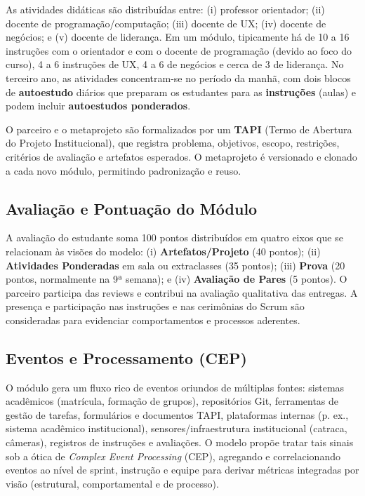 \documentclass[12pt,a4paper]{article}
\begin{document}
As atividades didáticas são distribuídas entre: (i) professor orientador;
(ii) docente de programação/computação; (iii) docente de UX; (iv) docente de
negócios; e (v) docente de liderança. Em um módulo, tipicamente há de 10 a 16
instruções com o orientador e com o docente de programação (devido ao foco do
curso), 4 a 6 instruções de UX, 4 a 6 de negócios e cerca de 3 de liderança. No
terceiro ano, as atividades concentram-se no período da manhã, com dois blocos
de \textbf{autoestudo} diários que preparam os estudantes para as \textbf{instruções}
(aulas) e podem incluir \textbf{autoestudos ponderados}.

O parceiro e o metaprojeto são formalizados por um \textbf{TAPI} (Termo de Abertura
do Projeto Institucional), que registra problema, objetivos, escopo, restrições,
critérios de avaliação e artefatos esperados. O metaprojeto é versionado e
clonado a cada novo módulo, permitindo padronização e reuso.

\subsection{Avaliação e Pontuação do Módulo}

A avaliação do estudante soma 100 pontos distribuídos em quatro eixos que se
relacionam às visões do modelo: (i) \textbf{Artefatos/Projeto} (40 pontos);
(ii) \textbf{Atividades Ponderadas} em sala ou extraclasses (35 pontos);
(iii) \textbf{Prova} (20 pontos, normalmente na 9ª semana); e (iv)
\textbf{Avaliação de Pares} (5 pontos). O parceiro participa das reviews
e contribui na avaliação qualitativa das entregas. A presença e participação nas
instruções e nas cerimônias do Scrum são consideradas para evidenciar
comportamentos e processos aderentes.

\subsection{Eventos e Processamento (CEP)}

O módulo gera um fluxo rico de eventos oriundos de múltiplas fontes: sistemas
acadêmicos (matrícula, formação de grupos), repositórios Git, ferramentas de
gestão de tarefas, formulários e documentos TAPI, plataformas internas (p. ex.,
sistema acadêmico institucional), sensores/infraestrutura institucional (catraca, câmeras), registros de
instruções e avaliações. O modelo propõe tratar tais sinais sob a ótica de
\textit{Complex Event Processing} (CEP), agregando e correlacionando eventos ao
nível de sprint, instrução e equipe para derivar métricas integradas por visão
(estrutural, comportamental e de processo).
\end{document}
